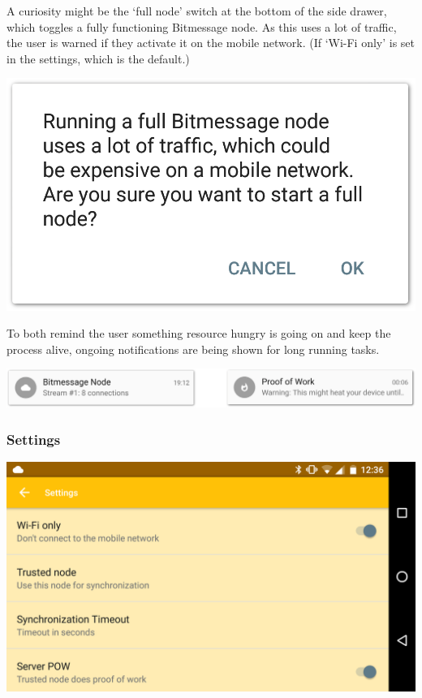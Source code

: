 \documentclass{bfh}
\begin{document}
\begin{center}
\begin{minipage}{.24\linewidth}
    \end{minipage}
  \end{center}

  A curiosity might be the `full node' switch at the bottom of the side drawer, which toggles a fully functioning Bitmessage node. As this uses a lot of traffic, the user is warned if they activate it on the mobile network. (If `Wi-Fi only' is set in the settings, which is the default.)

  \begin{center}
    \includegraphics[width=0.4 \textwidth]{images/screenshots/warning_dialog.png}
  \end{center}

  To both remind the user something resource hungry is going on and keep the process alive, ongoing notifications are being shown for long running tasks.

  \begin{center}
    \includegraphics[width=0.8 \textwidth]{images/screenshots/ongoing_notifications.png}
  \end{center}

  \subsubsection{Settings}

  \begin{center}
    \includegraphics[width=0.8 \textwidth]{images/screenshots/settings.png}
  \end{center}
\end{document}
